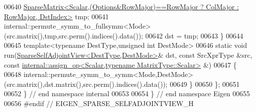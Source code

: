 \begin{DoxyCode}
00640     
      \hyperlink{group___sparse_core___module_class_eigen_1_1_sparse_matrix}{SparseMatrix<Scalar,(Options&RowMajor)==RowMajor ? ColMajor : RowMajor, DstIndex>}
       tmp;
00641     internal::permute\_symm\_to\_fullsymm<Mode>(src.matrix(),tmp,src.perm().indices().data());
00642     dst = tmp;
00643   \}
00644   
00645   \textcolor{keyword}{template}<\textcolor{keyword}{typename} DestType,\textcolor{keywordtype}{unsigned} \textcolor{keywordtype}{int} DestMode>
00646   \textcolor{keyword}{static} \textcolor{keywordtype}{void} run(\hyperlink{group___sparse_core___module_class_eigen_1_1_sparse_self_adjoint_view}{SparseSelfAdjointView<DestType,DestMode>}& dst, \textcolor{keyword}{
      const} SrcXprType &src, \textcolor{keyword}{const} 
      \hyperlink{struct_eigen_1_1internal_1_1assign__op}{internal::assign\_op<Scalar,typename MatrixType::Scalar>}
       &)
00647   \{
00648     internal::permute\_symm\_to\_symm<Mode,DestMode>(src.matrix(),dst.matrix(),src.perm().indices().data());
00649   \}
00650 \};
00651 
00652 \} \textcolor{comment}{// end namespace internal}
00653 
00654 \} \textcolor{comment}{// end namespace Eigen}
00655 
00656 \textcolor{preprocessor}{#endif // EIGEN\_SPARSE\_SELFADJOINTVIEW\_H}
\end{DoxyCode}
